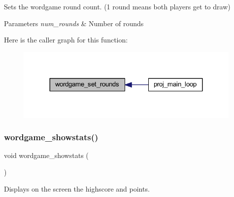 Sets the wordgame round count. (1 round means both players get to draw) 


\begin{DoxyParams}{Parameters}
{\em num\+\_\+rounds} & Number of rounds \\
\hline
\end{DoxyParams}
Here is the caller graph for this function\+:\nopagebreak
\begin{figure}[H]
\begin{center}
\leavevmode
\includegraphics[width=312pt]{group__wordpicker_ga1a2589aeb050207591f4e9645a352296_icgraph}
\end{center}
\end{figure}
\mbox{\label{group__wordpicker_ga88c86e1108700ca4a9a38a276e70e3c9}} 
\subsubsection{\texorpdfstring{wordgame\+\_\+showstats()}{wordgame\_showstats()}}
{\footnotesize\ttfamily void wordgame\+\_\+showstats (\begin{DoxyParamCaption}{ }\end{DoxyParamCaption})}



Displays on the screen the highscore and points. 

